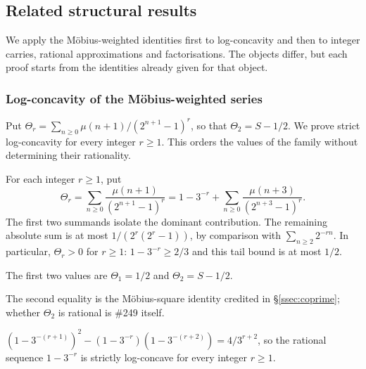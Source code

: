\subsection{Related structural results}

We apply the M\"obius-weighted identities first to log-concavity and
then to integer carries, rational approximations and factorisations.
The objects differ, but each proof starts from the identities already
given for that object.

\subsubsection{Log-concavity of the M\"obius-weighted series}

Put $\Theta_r=\sum_{n\ge0}\mu(n+1)/(2^{n+1}-1)^r$, so that
$\Theta_2=S-1/2$. We prove strict log-concavity for every integer
$r\ge1$. This orders the values of the family without determining their
rationality.


\begin{defn}
For each integer $r\ge1$, put
\[
 \Theta_r=\sum_{n\ge0}\frac{\mu(n+1)}{(2^{n+1}-1)^r}
 =1-3^{-r}+\sum_{n\ge0}\frac{\mu(n+3)}{(2^{n+3}-1)^r}.
\]
The first two summands isolate the dominant contribution. The remaining
absolute sum is at most $1/(2^r(2^r-1))$, by comparison with
$\sum_{n\ge2}2^{-rn}$. In particular, $\Theta_r>0$ for $r\ge1$:
$1-3^{-r}\ge2/3$ and this tail bound is at most $1/2$.
\quad {}
\quad {}
\end{defn}

\begin{thm}\label{thm:values-exponents-one-two}
The first two values are $\Theta_1=1/2$ and $\Theta_2=S-1/2$.
\end{thm}

\noindent The second equality is the M\"obius-square identity credited in
\S\ref{ssec:coprime}; whether $\Theta_2$ is rational is \#249 itself.

\begin{thm}\label{thm:first-two-summands-give-positive}
$(1-3^{-(r+1)})^2 - (1-3^{-r})(1-3^{-(r+2)}) = 4/3^{r+2}$,
so the rational sequence $1-3^{-r}$ is strictly log-concave for every integer $r\ge1$.
\end{thm}

